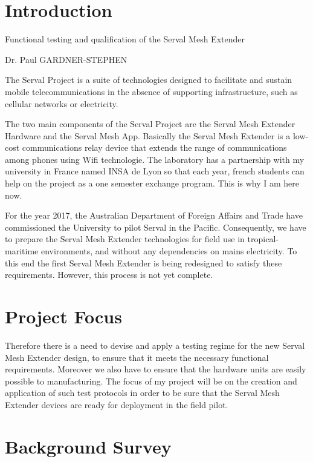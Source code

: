 \documentclass[a4paper, 11pt, oneside]{Thesis}  %
\begin{document}
\chapter{Introduction}
\begin{description}
\Large
\item[Title project: ] Functional testing and qualification of the Serval Mesh Extender
\item[Supervisor: ] Dr. Paul GARDNER-STEPHEN
\end{description}
\normalsize
The Serval Project is a suite of technologies designed to facilitate and sustain mobile telecommunications in the absence of supporting infrastructure, such as cellular networks or electricity. \par The two main components of the Serval Project are the Serval Mesh Extender Hardware and the Serval Mesh App. Basically the Serval Mesh Extender is a low-cost communications relay device that extends the range of communications among phones using Wifi technologie. The laboratory has a partnership with my university in France named INSA de Lyon so that each year, french students can help on the project as a one semester exchange program. This is why I am here now.  

For the year 2017, the Australian Department of Foreign Affairs and Trade have commissioned the University to pilot Serval in the Pacific. Consequently, we have to prepare the Serval Mesh Extender technologies for field use in tropical-maritime environments, and without any dependencies on mains electricity. To this end the first Serval Mesh Extender is being redesigned to satisfy these requirements. However, this process is not yet complete. \par

\chapter{Project Focus}

Therefore there is a need to devise and apply a testing regime for the new Serval Mesh Extender design, to ensure that it meets the necessary functional requirements. Moreover we also have to ensure that the hardware units are easily possible to manufacturing. The focus of my project will be on the creation and application of such test protocols in order to be sure that the Serval Mesh Extender devices are ready for deployment in the field pilot. 

\chapter{Background Survey}
\end{document}
